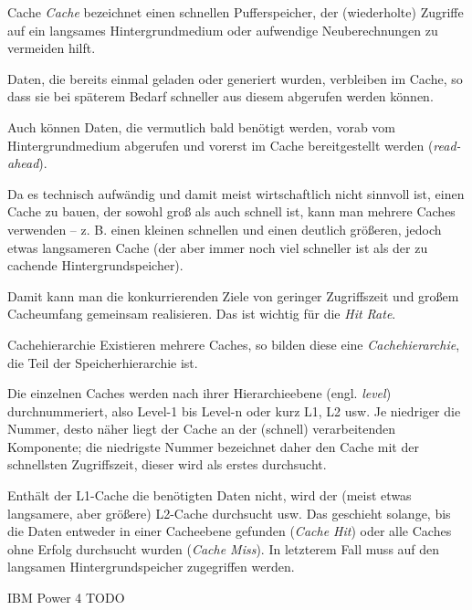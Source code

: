 \begin{defi}{Cache}
    \emph{Cache} bezeichnet einen schnellen Pufferspeicher, der (wiederholte) Zugriffe auf ein langsames Hintergrundmedium oder aufwendige Neuberechnungen zu vermeiden hilft.

    Daten, die bereits einmal geladen oder generiert wurden, verbleiben im Cache, so dass sie bei späterem Bedarf schneller aus diesem abgerufen werden können.

    Auch können Daten, die vermutlich bald benötigt werden, vorab vom Hintergrundmedium abgerufen und vorerst im Cache bereitgestellt werden (\emph{read-ahead}).

    Da es technisch aufwändig und damit meist wirtschaftlich nicht sinnvoll ist, einen Cache zu bauen, der sowohl groß als auch schnell ist, kann man mehrere Caches verwenden -- z. B. einen kleinen schnellen und einen deutlich größeren, jedoch etwas langsameren Cache (der aber immer noch viel schneller ist als der zu cachende Hintergrundspeicher).

    Damit kann man die konkurrierenden Ziele von geringer Zugriffszeit und großem Cacheumfang gemeinsam realisieren.
    Das ist wichtig für die \emph{Hit Rate}.
\end{defi}

\begin{defi}{Cachehierarchie}
    Existieren mehrere Caches, so bilden diese eine \emph{Cachehierarchie}, die Teil der Speicherhierarchie ist.

    Die einzelnen Caches werden nach ihrer Hierarchieebene (engl. \emph{level}) durchnummeriert, also Level-1 bis Level-n oder kurz L1, L2 usw.
    Je niedriger die Nummer, desto näher liegt der Cache an der (schnell) verarbeitenden Komponente;
    die niedrigste Nummer bezeichnet daher den Cache mit der schnellsten Zugriffszeit, dieser wird als erstes durchsucht.

    Enthält der L1-Cache die benötigten Daten nicht, wird der (meist etwas langsamere, aber größere) L2-Cache durchsucht usw.
    Das geschieht solange, bis die Daten entweder in einer Cacheebene gefunden (\emph{Cache Hit}) oder alle Caches ohne Erfolg durchsucht wurden (\emph{Cache Miss}).
    In letzterem Fall muss auf den langsamen Hintergrundspeicher zugegriffen werden.
\end{defi}

\begin{example}[Cachehierarchie]{IBM Power 4}
    TODO
\end{example}

